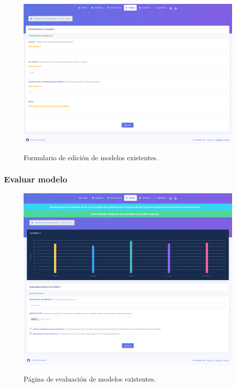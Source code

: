 \begin{figure}[h]
	\caption[Manual de usuario: editar modelo]{Formulario de edición de modelos existentes.}
	\centering
	\includegraphics[width=\textwidth]{../img/anexos/user_guide/5_edit_model}
	\label{e-5:edit-model}
\end{figure}


\subsubsection{Evaluar modelo}

\begin{figure}[h]
	\caption[Manual de usuario: evaluar modelo]{Página de evaluación de modelos existentes.}
	\centering
	\includegraphics[width=\textwidth]{../img/anexos/user_guide/5_test_model}
	\label{e-5:test-model}
\end{figure}


